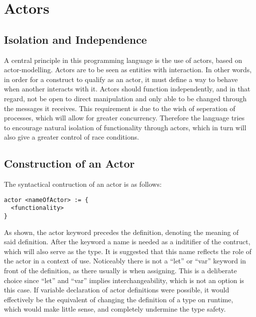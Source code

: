 \section{Actors}


\subsection{Isolation and Independence}

A central principle in this programming language is the use of actors, based on actor-modelling. Actors are to be seen as entities with interaction. In other words, in order for a construct to qualify as an actor, it must define a way to behave when another interacts with it. Actors should function independently, and in that regard, not be open to direct manipulation and only able to be changed through the messages it receives. This requirement is due to the wish of seperation of processes, which will allow for greater concurrency. Therefore the language tries to encourage natural isolation of functionality through actors, which in turn will also give a greater control of race conditions.

\subsection{Construction of an Actor}

The syntactical contruction of an actor is as follows:

\begin{lstlisting}
actor <nameOfActor> := {
  <functionality>
}
\end{lstlisting}

As shown, the actor keyword precedes the definition, denoting the meaning of said definition. After the keyword a name is needed as a inditifier of the contruct, which will also serve as the type. It is suggested that this name reflects the role of the actor in a context of use. Noticeably there is not a \enquote{let} or \enquote{var} keyword in front of the definition, as there usually is when assigning. This is a deliberate choice since \enquote{let} and \enquote{var} implies interchangeability, which is not an option is this case. If variable declaration of actor definitions were possible, it would effectively be the equivalent of changing the definition of a type on runtime, which would make little sense, and completely undermine the type safety.

